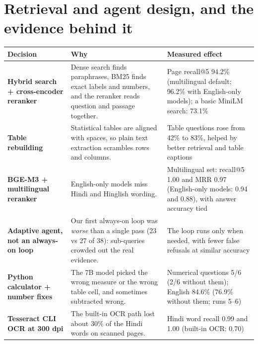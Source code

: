 \documentclass[10pt,a4paper]{article}
\begin{document}
\section{Retrieval and agent design, and the evidence behind it}
\renewcommand{\arraystretch}{1.2}
{\fontsize{8.4}{10.1}\selectfont
\begin{tabularx}{\textwidth}{@{}>{\raggedright\arraybackslash\bfseries}p{36mm} >{\raggedright\arraybackslash}X >{\raggedright\arraybackslash}p{54mm}@{}}
\toprule
\color{navy}Decision & \color{navy}\textbf{Why} & \color{navy}\textbf{Measured effect} \\ \midrule
Hybrid search + cross-encoder reranker & Dense search finds paraphrases, BM25 finds exact labels and numbers, and the reranker reads question and passage together. & Page recall@5 94.2\% (multilingual default; 96.2\% with English-only models); a basic MiniLM search: 73.1\% \\
Table rebuilding & Statistical tables are aligned with spaces, so plain text extraction scrambles rows and columns. & Table questions rose from 42\% to 83\%, helped by better retrieval and table captions \\
BGE-M3 + multilingual reranker & English-only models miss Hindi and Hinglish wording. & Multilingual set: recall@5 1.00 and MRR 0.97 (English-only models: 0.94 and 0.88), with answer accuracy tied \\
Adaptive agent, not an always-on loop & Our first always-on loop was \emph{worse} than a single pass (23 vs 27 of 38): sub-queries crowded out the real evidence. & The loop runs only when needed, with fewer false refusals at similar accuracy \\
Python calculator + number fixes & The 7B model picked the wrong measure or the wrong table cell, and sometimes subtracted wrong. & Numerical questions 5/6 (2/6 without them); English 84.6\% (76.9\% without them; runs 5--6) \\
Tesseract CLI OCR at 300 dpi & The built-in OCR path lost about 30\% of the Hindi words on scanned pages. & Hindi word recall 0.99 and 1.00 (built-in OCR: 0.70) \\
\bottomrule
\end{tabularx}}
\end{document}

